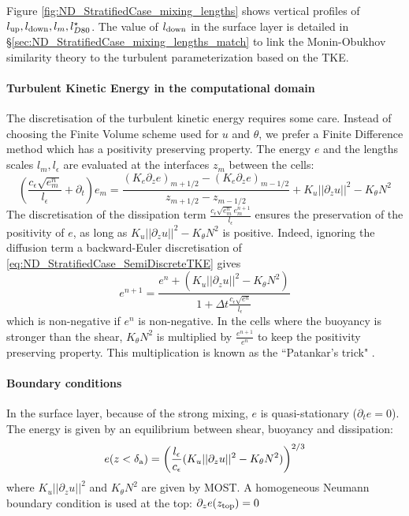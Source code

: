 Figure \ref{fig:ND_StratifiedCase_mixing_lengths} shows vertical
profiles of $l_{\rm up}, l_{\rm down}, l_m, l_{D80}^\star$. The value of
$l_{\rm down}$ in the surface layer is detailed in
\S \ref{sec:ND_StratifiedCase_mixing_lengths_match} to link
the Monin-Obukhov similarity theory to the turbulent
parameterization based on the TKE.
%
\paragraph{Turbulent Kinetic Energy in the computational domain}
The discretisation of the turbulent kinetic energy
requires some care. Instead of choosing the Finite Volume scheme
used for $u$ and $\theta$, we prefer a Finite Difference
method which has a positivity preserving property.
The energy $e$ and the lengths scales
$l_m, l_\epsilon$ are evaluated at the interfaces
$z_m$ between the cells:
\begin{equation}
\label{eq:ND_StratifiedCase_SemiDiscreteTKE}
    \left(
    \frac{c_\epsilon \sqrt{e^n_m}}{l_\epsilon}
    + \partial_t
    \right) e_m
	=\frac{(K_{e} \partial_z e)_{m+1/2} -
	(K_{e} \partial_z e)_{m-1/2}}{
	z_{m+1/2} - z_{m-1/2}
	}
    + K_u ||\partial_z u||^2
    - K_\theta N^2
\end{equation}
The discretisation of the dissipation term
$\frac{c_\epsilon \sqrt{e_m^n}e_m^{n+1}}{l_\epsilon}$
ensures the preservation
of the positivity of $e$, as long as
$K_u ||\partial_z u||^2 - K_\theta N^2$ is positive.
Indeed, ignoring the diffusion term a backward-Euler
discretisation of \eqref{eq:ND_StratifiedCase_SemiDiscreteTKE}
gives
\begin{equation}
	e^{n+1} = \frac{e^n +
	\left(K_u ||\partial_z u||^2 - K_\theta N^2\right)}
	{1 + \Delta t \frac{c_\epsilon \sqrt{e^n}}{l_\epsilon}}
\end{equation}
which is non-negative if $e^n$ is non-negative.
In the cells where the buoyancy is stronger than the shear,
$K_\theta N^2$ is multiplied by
$\frac{e^{n+1}}{e^n}$ to keep the positivity preserving property.
This multiplication is known as the ``Patankar's trick"
\citep{lemarie_simplified_2021}.
%
\paragraph{Boundary conditions}
In the surface layer, because of the strong mixing, $e$ is
quasi-stationary ($\partial_t e = 0$). The energy is given by
an equilibrium between shear, buoyancy and dissipation:
\begin{equation}
	\label{eq:ND_StratifiedCase_TKE_SL_cond}
e(z<\delta_{\rm a}) = \left(\frac{l_\epsilon}{c_\epsilon}
(K_u||\partial_z u||^2 - K_\theta N^2)\right)^{2/3}
\end{equation}
where $K_u||\partial_z u||^2$ and $K_\theta N^2$ are given by MOST.
A homogeneous Neumann boundary condition is used at the top:
$\partial_z e (z_{\rm top}) = 0$


